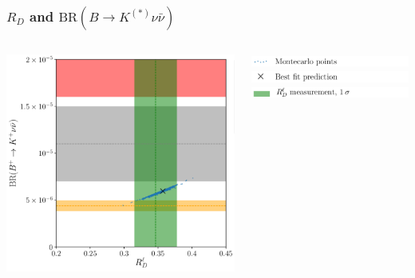 \documentclass[mathserif, 10pt, dvipsnames]{beamer}
\begin{document}
\begin{frame}\frametitle{$R_D$ and $\mathrm{BR}(B\to K^{(*)}\nu\bar{\nu})$}

    \begin{center}
        \begin{columns}[onlytextwidth]
            \begin{column}{0.55\textwidth}
                \includegraphics[width=\textwidth]{figures/RD_BKnunu_plot.pdf}
            \end{column}
            \begin{column}{0.45\textwidth}
                \includegraphics[width=\textwidth]{figures/RD_BKnunu_leg1.pdf}\\[2pt]
                \includegraphics[width=\textwidth]{figures/RD_BKnunu_leg2.pdf}\\[2pt]
                \includegraphics[width=\textwidth]{figures/RD_BKnunu_leg3.pdf}\\[-6pt]

\end{column}
\end{columns}
\end{center}
\end{frame}
\end{document}
